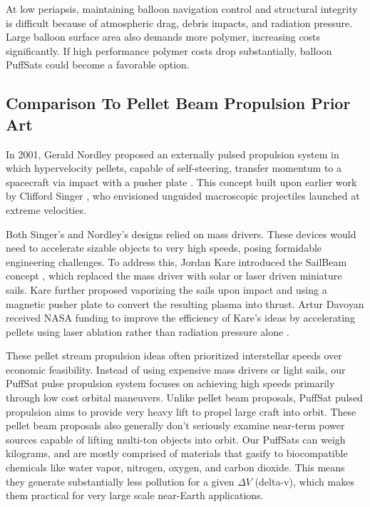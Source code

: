 \documentclass{article}
\begin{document}
At low periapsis, maintaining balloon navigation control and structural integrity is difficult because of  atmospheric drag, debris impacts, and radiation pressure. Large balloon surface area also demands more polymer, increasing costs significantly. If high performance polymer costs drop substantially, balloon PuffSats could become a favorable option.

\subsection{Comparison To Pellet Beam Propulsion Prior Art}
In 2001, Gerald Nordley proposed an externally pulsed propulsion system in which hypervelocity pellets, capable of self-steering, transfer momentum to a spacecraft via impact with a pusher plate \cite{nordley2001interstellar}. This concept built upon earlier work by Clifford Singer \cite{singer1979interstellar}, who envisioned unguided macroscopic projectiles launched at extreme velocities. 

Both Singer’s and Nordley’s designs relied on mass drivers.  These devices would need to accelerate sizable objects to very high speeds, posing formidable engineering challenges. To address this, Jordan Kare introduced the SailBeam concept \cite{kare2001sailbeam}, which replaced the mass driver with solar or laser driven miniature sails. Kare further proposed vaporizing the sails upon impact and using a magnetic pusher plate to convert the resulting plasma into thrust.   Artur Davoyan received NASA funding to improve the efficiency of Kare's ideas by accelerating pellets using laser ablation rather than radiation pressure alone \cite{davoyan2023pelletbeam}.

These pellet stream propulsion ideas often prioritized interstellar speeds over economic feasibility.  Instead of using expensive mass drivers or light sails, our PuffSat pulse propulsion system focuses on achieving high speeds primarily through low cost orbital maneuvers.  Unlike pellet beam proposals, PuffSat pulsed propulsion aims to  provide very heavy lift to propel large craft into orbit.  These pellet beam proposals also generally don't seriously examine near-term power sources capable of lifting multi-ton objects into orbit. Our PuffSats can weigh kilograms, and are mostly comprised of materials that gasify to biocompatible chemicals like water vapor, nitrogen, oxygen, and carbon dioxide.   This means they generate substantially less pollution for a given $\Delta V$ (delta-v), which makes them practical for very large scale near-Earth applications.  
\end{document}
